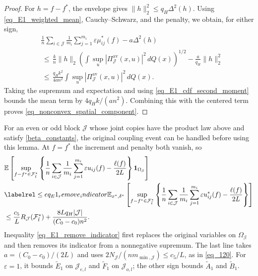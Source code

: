 \documentclass[twoside,11pt]{article}
\newenvironment{revision}{\color{revisionred}}{}
\begin{document}
\begin{revision}
\begin{proof}
For $h=f-f^*$, the envelope gives
$\|h\|_2^2\leq q_H\Delta^2(h)$. Using
\eqref{eq_E1_weighted_mean}, Cauchy--Schwarz, and the penalty,
we obtain, for either sign,
\begin{align*}
&\frac1n\sum_{i\in\mathcal J}\frac1{m_i}\sum_{j=1}^{m_i}
\varepsilon\mu_{ij}^*(f)-a\Delta^2(h)\\
&\,\leq\,\frac{k}{n}\|h\|_2
\left(\int\sup_u|\Pi_{\mathcal J}^{\mathrm{av}}(x,u)|^2\,dQ(x)\right)^{1/2}
-\frac{a}{q_H}\|h\|_2^2\\
&\,\leq\,\frac{q_Hk^2}{4a n^2}
\int\sup_u|\Pi_{\mathcal J}^{\mathrm{av}}(x,u)|^2\,dQ(x).
\end{align*}
Taking the supremum and expectation and using
\eqref{eq_E1_cdf_second_moment} bounds the mean term by
$4q_Hk/(a n^2)$.
Combining this with the centered term proves
\eqref{eq_nonconvex_spatial_component}.
\end{proof}

For an even or odd block $\mathcal J$ whose joint copies have the
product law above and satisfy \eqref{beta_constants}, the original
coupling event can be handled before using this lemma. At $f=f^*$
the increment and penalty both vanish, so
\begin{align*}
&\mathbb E\left[
\sup_{f-f^*\in\mathcal F_{\tilde t}^{\star}}
\left\{\frac1n\sum_{i\in\mathcal J}\frac1{m_i}\sum_{j=1}^{m_i}
\varepsilon u_{ij}(f)-\frac{\ell(f)}{2L}\right\}
\mathbf1_{\Omega_\beta}\right]\\
&\labelrel\leq{eq_E1_remove_indicator}
\mathbb E_{x^*,\delta^*}\left[
\sup_{f-f^*\in\mathcal F_{\tilde t}^{\star}}
\left\{\frac1n\sum_{i\in\mathcal J}\frac1{m_i}\sum_{j=1}^{m_i}
\varepsilon u_{ij}^*(f)-\frac{\ell(f)}{2L}\right\}\right]\\
&\leq\frac{c_5}{L}R_{\mathcal J}(\mathcal F_{\tilde t}^{\star})
+\frac{8Lq_H|\mathcal J|}{(C_0-c_0)n^2}.
\end{align*}
Inequality \eqref{eq_E1_remove_indicator} first replaces the original
variables on $\Omega_\beta$ and then removes its indicator from a
nonnegative supremum. The last line takes
$a=(C_0-c_0)/(2L)$ and uses
$2N_{\mathcal J}/(nm_{\min,\mathcal J})\leq c_5/L$,
as in \eqref{eq_120}. For $\varepsilon=1$, it bounds $\tilde E_1$
on $\mathcal J_{e,l}$ and $\tilde F_1$ on $\mathcal J_{o,l}$;
the other sign bounds $\tilde A_1$ and $\tilde B_1$.
\end{revision}
\end{document}
